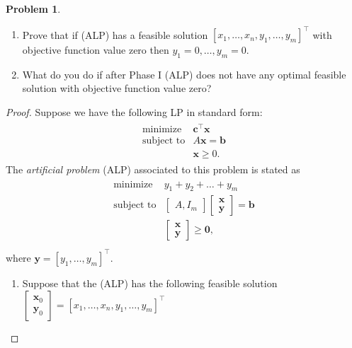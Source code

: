 \documentclass[12pt]{article}
\theoremstyle{definition}
\newtheorem{problem}{Problem}
\newcommand{\vect}[1]{\boldsymbol{#1}}
\begin{document}
\begin{problem}
  \begin{enumerate}
    \item Prove that if (ALP) has a feasible solution $[x_1, \dots, x_n, y_1, \dots, y_m]^\intercal$
      with objective function value zero then $y_1 = 0, \dots, y_m = 0$.
    \item What do you do if after Phase I (ALP) does not have any optimal feasible
      solution with objective function value zero?
  \end{enumerate}
\end{problem}

\begin{proof}
  Suppose we have the following LP in standard form:
  \begin{align*}
    \begin{array}{rl}
      \text{minimize} & \vect{c}^\intercal \vect{x}\\
      \text{subject to} & A\vect{x} = \vect{b}\\
      & \vect{x} \geq 0.
    \end{array}
  \end{align*}
  The \textit{artificial problem} (ALP) associated to this problem is stated as
  \begin{align}\label{alp}
    \begin{array}{rl}
      \text{minimize} & y_1 + y_2 + \dots + y_m \\
      \text{subject to} & \begin{bmatrix}A, I_m\end{bmatrix} \begin{bmatrix}\vect{x} \\ \vect{y}\end{bmatrix} = \vect{b} \\
      & \begin{bmatrix} \vect{x} \\ \vect{y} \end{bmatrix} \geq \vect{0},\\
    \end{array}
  \end{align}
  where $\vect{y} = [y_1, \dots, y_m]^\intercal$.
  \begin{enumerate}
    \item Suppose that the (ALP) has the following feasible solution
      $\begin{bmatrix}\vect{x}_0 \\ \vect{y}_0\end{bmatrix} = [x_1, \dots, x_n, y_1, \dots, y_m]^\intercal$

\end{enumerate}
\end{proof}
\end{document}
